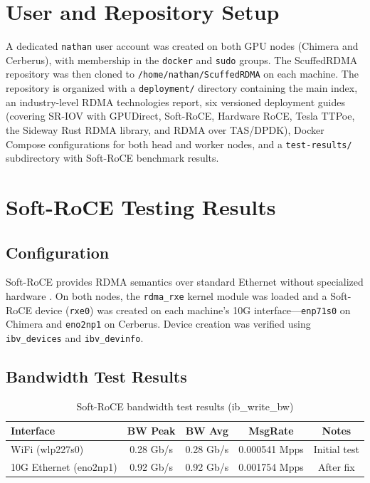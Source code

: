 \documentclass[10pt,letterpaper]{article}
\begin{document}
\section{User and Repository Setup}

A dedicated \texttt{nathan} user account was created on both GPU nodes (Chimera and Cerberus), with membership in the \texttt{docker} and \texttt{sudo} groups. The ScuffedRDMA repository was then cloned to \texttt{/home/nathan/ScuffedRDMA} on each machine. The repository is organized with a \texttt{deployment/} directory containing the main index, an industry-level RDMA technologies report, six versioned deployment guides (covering SR-IOV with GPUDirect, Soft-RoCE, Hardware RoCE, Tesla TTPoe, the Sideway Rust RDMA library, and RDMA over TAS/DPDK), Docker Compose configurations for both head and worker nodes, and a \texttt{test-results/} subdirectory with Soft-RoCE benchmark results.

\section{Soft-RoCE Testing Results}

\subsection{Configuration}

Soft-RoCE provides RDMA semantics over standard Ethernet without specialized hardware \cite{rdma-core}. On both nodes, the \texttt{rdma\_rxe} kernel module was loaded and a Soft-RoCE device (\texttt{rxe0}) was created on each machine's 10G interface---\texttt{enp71s0} on Chimera and \texttt{eno2np1} on Cerberus. Device creation was verified using \texttt{ibv\_devices} and \texttt{ibv\_devinfo}.

\subsection{Bandwidth Test Results}

\begin{table}[H]
\centering
\small
\begin{tabular}{@{}lcccc@{}}
\toprule
\textbf{Interface} & \textbf{BW Peak} & \textbf{BW Avg} & \textbf{MsgRate} & \textbf{Notes} \\
\midrule
WiFi (wlp227s0) & 0.28 Gb/s & 0.28 Gb/s & 0.000541 Mpps & Initial test \\
10G Ethernet (eno2np1) & 0.92 Gb/s & 0.92 Gb/s & 0.001754 Mpps & After fix \\
\bottomrule
\end{tabular}
\caption{Soft-RoCE bandwidth test results (ib\_write\_bw)}
\end{table}
\end{document}
